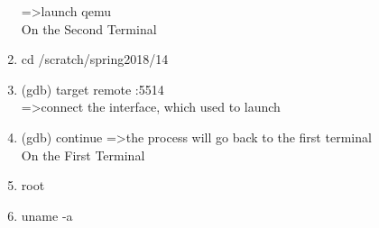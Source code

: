 \documentclass[english,10pt,letterpaper,onecolumn]{IEEEtran}
\begin{document}
\begin{center}
\begin{enumerate}
  =\textgreater launch qemu\\
On the Second Terminal \\
  \item cd /scratch/spring2018/14
  \item (gdb) target remote :5514\\
   =\textgreater connect the interface, which used to launch 
  \item (gdb) continue
   =\textgreater the process will go back to the first terminal\\
On the First Terminal \\
  \item root
  \item uname -a
\end{enumerate}
\end{center}
\clearpage
\end{document}
